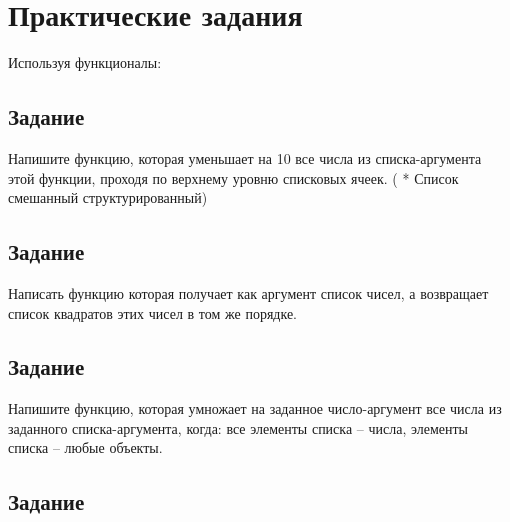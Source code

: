 \section{Практические задания}
Используя функционалы:

\subsection{Задание }

Напишите функцию, которая уменьшает на 10 все числа из списка-аргумента этой
функции, проходя по верхнему уровню списковых ячеек. ( * Список смешанный структурированный)


\subsection{Задание }

Написать функцию которая получает как аргумент список чисел, а возвращает список квадратов этих чисел в том же порядке.

\pagebreak

\subsection{Задание }

Напишите функцию, которая умножает на заданное число-аргумент все числа из заданного списка-аргумента, когда: все элементы списка -- числа, элементы списка -- любые объекты.
 

\subsection{Задание }

